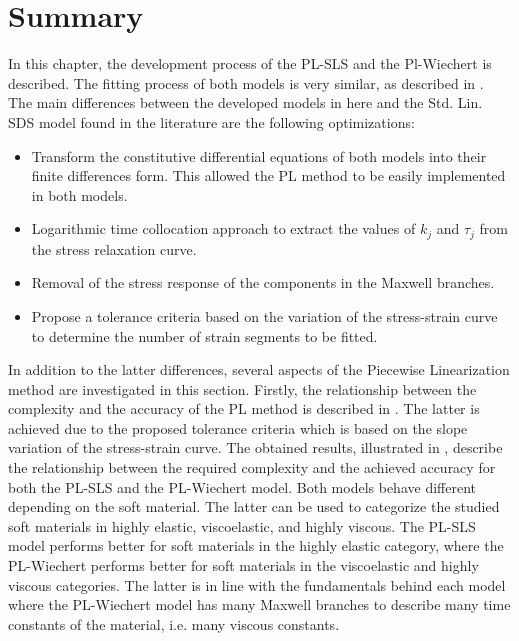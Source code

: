 \section{Summary}

In this chapter, the development process of the PL-SLS and the Pl-Wiechert is described. The fitting process of both models is very similar, as described in . The main differences between the developed models in here and the Std. Lin. SDS model found in the literature \cite{austin2015control} are the following optimizations: 

\begin{itemize}
	\item Transform the constitutive differential equations of both models into their finite differences form. This allowed the PL method to be easily implemented in both models.
	\item Logarithmic time collocation approach to extract the values of $k_j$ and $\tau_j$ from the stress relaxation curve.
	\item Removal of the stress response of the components in the Maxwell branches.
	\item Propose a tolerance criteria based on the variation of the stress-strain curve to determine the number of strain segments to be fitted.
\end{itemize}

In addition to the latter differences, several aspects of the Piecewise Linearization method are investigated in this section. Firstly, the relationship between the complexity and the accuracy of the PL method is described in . The latter is achieved due to the proposed tolerance criteria which is based on the slope variation of the stress-strain curve. The obtained results, illustrated in , describe the relationship between the required complexity and the achieved accuracy for both the PL-SLS and the PL-Wiechert model. Both models behave different depending on the soft material. The latter can be used to categorize the studied soft materials in highly elastic, viscoelastic, and highly viscous. The PL-SLS model performs better for soft materials in the highly elastic category, where the PL-Wiechert performs better for soft materials in the viscoelastic and highly viscous categories. The latter is in line with the fundamentals behind each model where the PL-Wiechert model has many Maxwell branches to describe many time constants of the material, i.e. many viscous constants. 


